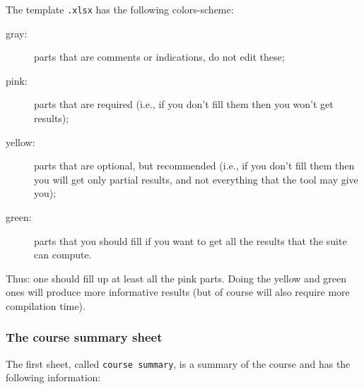 \begin{centering}
\end{centering}

The template \texttt{.xlsx} has the following colors-scheme:
%
\begin{description}
	\item[gray:] parts that are comments or indications, do not edit
		these;
	\item[pink:] parts that are required (i.e., if you don't fill
		them then you won't get results); 
	\item[yellow:] parts that are optional, but recommended (i.e., if
		you don't fill them then you will get only partial results,
		and not everything that the tool may give you); 
	\item[green:] parts that you should fill if you want to get all the
		results that the suite can compute.
\end{description}
%
Thus: one should fill up at least all the pink parts. Doing the yellow and
green ones will produce more informative results (but of course will also
require more compilation time).


\subsubsection{The course summary sheet}
\label{sssec:the_course_summary_sheet}

The first sheet, called \texttt{course summary}, is a summary of the course and has the following information:

